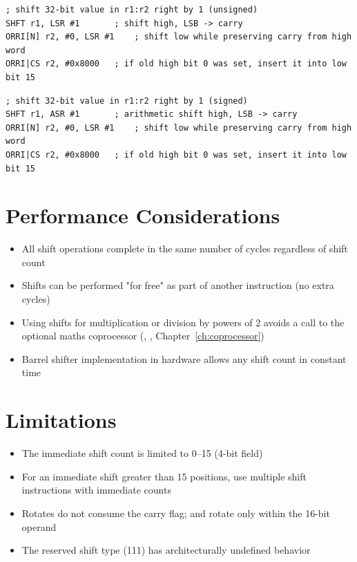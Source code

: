 \begin{example}
	\begin{lstlisting}
; shift 32-bit value in r1:r2 right by 1 (unsigned)
SHFT r1, LSR #1       ; shift high, LSB -> carry
ORRI[N] r2, #0, LSR #1    ; shift low while preserving carry from high word
ORRI|CS r2, #0x8000   ; if old high bit 0 was set, insert it into low bit 15
	\end{lstlisting}
	\caption{32-bit Right Shift (Unsigned)}
\end{example}

\begin{example}
	\begin{lstlisting}
; shift 32-bit value in r1:r2 right by 1 (signed)
SHFT r1, ASR #1       ; arithmetic shift high, LSB -> carry
ORRI[N] r2, #0, LSR #1    ; shift low while preserving carry from high word
ORRI|CS r2, #0x8000   ; if old high bit 0 was set, insert it into low bit 15
	\end{lstlisting}
	\caption{32-bit Right Shift (Signed)}
\end{example}

\section{Performance Considerations}

\begin{itemize}
	\item All shift operations complete in the same number of cycles regardless of shift count
	\item Shifts can be performed "for free" as part of another instruction (no extra cycles)
	\item Using shifts for multiplication or division by powers of 2 avoids a call to the optional maths coprocessor
	      (, , Chapter~\ref{ch:coprocessor})
	\item Barrel shifter implementation in hardware allows any shift count in constant time
\end{itemize}

\section{Limitations}

\begin{itemize}
	\item The immediate shift count is limited to 0--15 (4-bit field)
	\item For an immediate shift greater than 15 positions, use multiple shift instructions with immediate counts
	\item Rotates do not consume the carry flag;  and  rotate only within the 16-bit operand
	\item The reserved shift type (111) has architecturally undefined behavior
\end{itemize}

